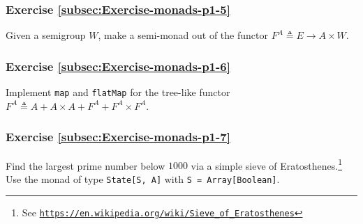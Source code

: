 \subsubsection{Exercise \label{subsec:Exercise-monads-p1-5}\ref{subsec:Exercise-monads-p1-5}}

Given a semigroup $W$, make a semi-monad out of the functor $F^{A}\triangleq E\rightarrow A\times W$.

\subsubsection{Exercise \label{subsec:Exercise-monads-p1-6}\ref{subsec:Exercise-monads-p1-6}}

Implement \lstinline!map! and \lstinline!flatMap! for the tree-like
functor $F^{A}\triangleq A+A\times A+F^{A}+F^{A}\times F^{A}$.

\subsubsection{Exercise \label{subsec:Exercise-monads-p1-7}\ref{subsec:Exercise-monads-p1-7}}

Find the largest prime number below $1000$ via a simple sieve of
Eratosthenes.\footnote{See \texttt{\href{https://en.wikipedia.org/wiki/Sieve_of_Eratosthenes}{https://en.wikipedia.org/wiki/Sieve\_of\_Eratosthenes}}}
Use the monad of type \lstinline!State[S, A]! with \lstinline!S = Array[Boolean]!.

